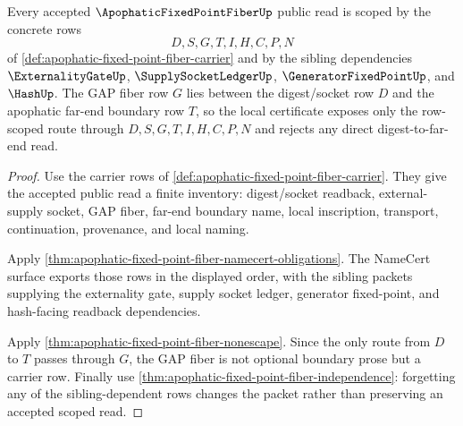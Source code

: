 \begin{theorem}
\label{thm:apophatic-fixed-point-fiber-scoped-route}
Every accepted $\ApophaticFixedPointFiberUp$ public read is scoped by the concrete rows
$$
D,S,G,T,I,H,C,P,N
$$
of \autoref{def:apophatic-fixed-point-fiber-carrier} and by the sibling dependencies $\ExternalityGateUp$, $\SupplySocketLedgerUp$, $\GeneratorFixedPointUp$, and $\HashUp$. The GAP fiber row $G$ lies between the digest/socket row $D$ and the apophatic far-end boundary row $T$, so the local certificate exposes only the row-scoped route through $D,S,G,T,I,H,C,P,N$ and rejects any direct digest-to-far-end read.
\end{theorem}
\begin{proof}
Use the carrier rows of \autoref{def:apophatic-fixed-point-fiber-carrier}. They give the accepted public read a finite inventory: digest/socket readback, external-supply socket, GAP fiber, far-end boundary name, local inscription, transport, continuation, provenance, and local naming.

Apply \autoref{thm:apophatic-fixed-point-fiber-namecert-obligations}. The NameCert surface exports those rows in the displayed order, with the sibling packets supplying the externality gate, supply socket ledger, generator fixed-point, and hash-facing readback dependencies.

Apply \autoref{thm:apophatic-fixed-point-fiber-nonescape}. Since the only route from $D$ to $T$ passes through $G$, the GAP fiber is not optional boundary prose but a carrier row. Finally use \autoref{thm:apophatic-fixed-point-fiber-independence}: forgetting any of the sibling-dependent rows changes the packet rather than preserving an accepted scoped read.
\end{proof}

